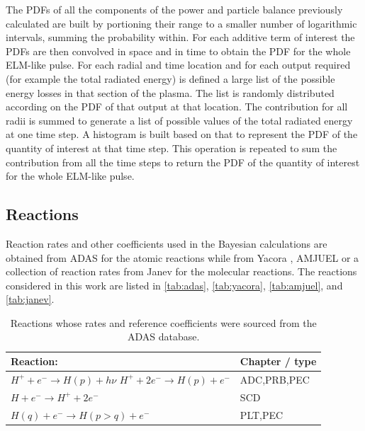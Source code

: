 The PDFs of all the components of the power and particle balance previously calculated are built by portioning their range to a smaller number of logarithmic intervals, summing the probability within. For each additive term of interest the PDFs are then convolved in space and in time to obtain the PDF for the whole ELM-like pulse. For each radial and time location and for each output required (for example the total radiated energy) is defined a large list of the possible energy losses in that section of the plasma. The list is randomly distributed according on the PDF of that output at that location. The contribution for all radii is summed to generate a list of possible values of the total radiated energy at one time step. A histogram is built based on that to represent the PDF of the quantity of interest at that time step. This operation is repeated to sum the contribution from all the time steps to return the PDF of the quantity of interest for the whole ELM-like pulse.

\subsection{Reactions}\label{Reactions}

Reaction rates and other coefficients used in the Bayesian calculations are obtained from ADAS\cite{Summers2004,OMullane2013} for the atomic reactions while from Yacora \cite{Wunderlich2016,Wunderlich2020}, AMJUEL\cite{Reiter2017,Reiter2005,Kotov2007} %
or a collection of reaction rates from Janev\cite{Janev2003} for the molecular reactions. The reactions considered in this work are listed in \autoref{tab:adas}, \ref{tab:yacora}, \ref{tab:amjuel}, %
and \ref{tab:janev}.

\begin{table}[h]
\begin{tabular}{ | p{7cm}| m{3.5cm} | } 
\hline
Reaction: & Chapter / type \\ 
\hline
$H^+ + e^- \rightarrow H(p) + h\nu$ \newline $H^+ + 2e^- \rightarrow H(p) + e^-$ & ADC,PRB,PEC \\ 
\hline
$H + e^- \rightarrow H^+ + 2e^-$ & SCD \\
\hline
$H(q) + e^- \rightarrow H(p>q) + e^-$ & PLT,PEC\\
\hline
\end{tabular}
\caption{Reactions whose rates and reference coefficients were sourced from the ADAS database.\cite{Summers2004,OMullane2013}}
\label{tab:adas}
\end{table}

